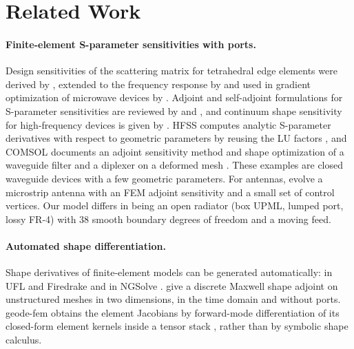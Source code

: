 \documentclass{anvil-paper}
\begin{document}
\section{Related Work}
\label{sec:related}

\paragraph{Finite-element S-parameter sensitivities with ports.}
Design sensitivities of the scattering matrix for tetrahedral edge
elements were derived by \citet{webb2000design}, extended to the frequency
response by \citet{webb2002design} and used in gradient optimization of
microwave devices by \citet{nair2003optimization}. Adjoint and
self-adjoint formulations for S-parameter sensitivities are reviewed by
\citet{nikolova2004adjoint} and \citet{nikolova2006network}, and continuum
shape sensitivity for high-frequency devices is given by
\citet{choi2011generalized}. HFSS computes analytic S-parameter derivatives
with respect to geometric parameters by reusing the LU factors
\citep{ansys_hfss_derivatives,vardapetyan2008sensitivity}, and COMSOL
documents an adjoint sensitivity method and shape optimization of a
waveguide filter and a diplexer on a deformed mesh
\citep{comsol_sensitivity_method,jensen2022comsolshape}. These examples are
closed waveguide devices with a few geometric parameters. For antennas,
\citet{ghassemi2013antenna} evolve a microstrip antenna with an FEM adjoint
sensitivity and a small set of control vertices. Our model differs in
being an open radiator (box UPML, lumped port, lossy FR-4) with $38$
smooth boundary degrees of freedom and a moving feed.

\paragraph{Automated shape differentiation.}
Shape derivatives of finite-element models can be generated
automatically: in UFL and Firedrake \citep{ham2019automated,ham2020,paganini2021fireshape}
and in NGSolve \citep{gangl2021fully}. \citet{wang2011} give a discrete
Maxwell shape adjoint on unstructured meshes in two dimensions, in the time
domain and without ports. geode-fem obtains the element Jacobians by
forward-mode differentiation of its closed-form element kernels inside a
tensor stack \citep{burn}, rather than by symbolic shape calculus.
\end{document}
